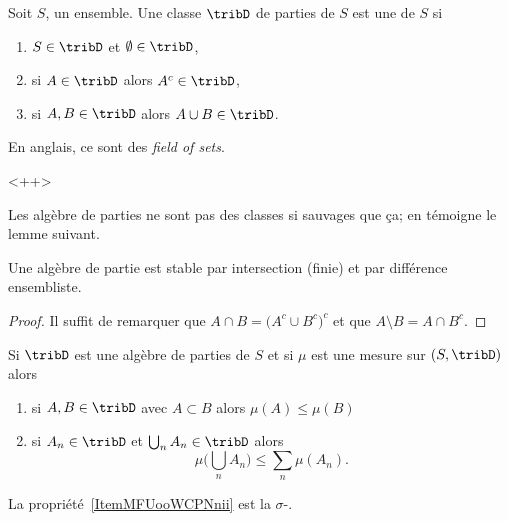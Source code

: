 \begin{definition}   \label{DefTCUoogGDud}
	Soit \( S\), un ensemble. Une classe \( \tribD\) de parties de \( S\) est une  de \( S\) si
	\begin{enumerate}
		\item
		      \( S\in\tribD\) et \( \emptyset\in\tribD\),
		\item
		      si \( A\in\tribD\) alors \( A^c\in\tribD\),
		\item
		      si \( A,B\in\tribD\) alors \( A\cup B\in\tribD\).
	\end{enumerate}
\end{definition}

\begin{normaltext}
    En anglais, ce sont des \emph{field of sets}\cite{BIBooNBGPooSPkEKX}.
\end{normaltext}<++>

Les algèbre de parties ne sont pas des classes si sauvages que ça; en témoigne le lemme suivant.
\begin{lemma}   \label{LemBFKootqXKl}
	Une algèbre de partie est stable par intersection (finie) et par différence ensembliste.
\end{lemma}

\begin{proof}
	Il suffit de remarquer que \( A\cap B=\big( A^c\cup B^c \big)^c\) et que \( A\setminus B=A\cap B^c\).
\end{proof}

\begin{lemma}  \label{LemZQUooMdCpq}
	Si \( \tribD\) est une algèbre de parties de \( S\) et si \( \mu\) est une mesure sur \( (S,\tribD)\) alors
	\begin{enumerate}
		\item
		      si \( A,B\in\tribD\) avec \( A\subset B\) alors \( \mu(A)\leq \mu(B)\)
		\item   \label{ItemMFUooWCPNnii}
		      si \( A_n\in\tribD\) et \( \bigcup_nA_n\in\tribD\) alors
		      \begin{equation}
			      \mu\big( \bigcup_nA_n \big)\leq\sum_n\mu(A_n).
		      \end{equation}
	\end{enumerate}
\end{lemma}
La propriété~\ref{ItemMFUooWCPNnii} est la \( \sigma\)-.


